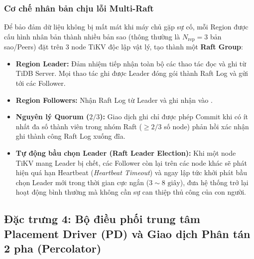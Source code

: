 \subsubsection{Cơ chế nhân bản chịu lỗi Multi-Raft}
Để bảo đảm dữ liệu không bị mất mát khi máy chủ gặp sự cố, mỗi Region được cấu hình nhân bản thành nhiều bản sao (thông thường là $N_{\text{rep}} = 3$ bản sao/Peers) đặt trên 3 node TiKV độc lập vật lý, tạo thành một \textbf{Raft Group}:
\begin{itemize}
  \item \textbf{Region Leader:} Đảm nhiệm tiếp nhận toàn bộ các thao tác đọc và ghi từ TiDB Server. Mọi thao tác ghi được Leader đóng gói thành Raft Log và gửi tới các Follower.
  \item \textbf{Region Followers:} Nhận Raft Log từ Leader và ghi nhận vào .
  \item \textbf{Nguyên lý Quorum ($2/3$):} Giao dịch ghi chỉ được phép Commit khi có ít nhất đa số thành viên trong nhóm Raft ($\ge 2/3$ số node) phản hồi xác nhận ghi thành công Raft Log xuống đĩa.
  \item \textbf{Tự động bầu chọn Leader (Raft Leader Election):} Khi một node TiKV mang Leader bị chết, các Follower còn lại trên các node khác sẽ phát hiện quá hạn Heartbeat (\textit{Heartbeat Timeout}) và ngay lập tức khởi phát bầu chọn Leader mới trong thời gian cực ngắn ($3 \sim 8\text{ giây}$), đưa hệ thống trở lại hoạt động bình thường mà không cần sự can thiệp thủ công của con người.
\end{itemize}

\subsection{Đặc trưng 4: Bộ điều phối trung tâm Placement Driver (PD) và Giao dịch Phân tán 2 pha (Percolator)}

